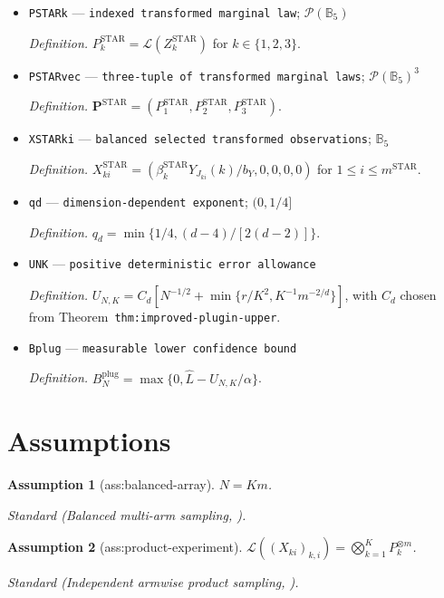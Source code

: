 \documentclass{article}
\newtheorem{assumption}{Assumption}
\begin{document}
\begin{itemize}
  \item \texttt{PSTARk} --- \texttt{indexed transformed marginal law}; \(\mathcal P(\mathbb B_5)\)
  \par\smallskip\noindent\emph{Definition.} \(P_k^{\mathrm{STAR}}=\mathcal L(Z_k^{\mathrm{STAR}})\) for \(k\in\{1,2,3\}\).
  \item \texttt{PSTARvec} --- \texttt{three-\allowbreak{}tuple of transformed marginal laws}; \(\mathcal P(\mathbb B_5)^3\)
  \par\smallskip\noindent\emph{Definition.} \(\mathbf P^{\mathrm{STAR}}=(P_1^{\mathrm{STAR}},P_2^{\mathrm{STAR}},P_3^{\mathrm{STAR}})\).
  \item \texttt{XSTARki} --- \texttt{balanced selected transformed observations}; \(\mathbb B_5\)
  \par\smallskip\noindent\emph{Definition.} \(X_{ki}^{\mathrm{STAR}}=(\beta_k^{\mathrm{STAR}}Y_{J_{ki}}(k)/b_Y,0,0,0,0)\) for \(1\le i\le m^{\mathrm{STAR}}\).
  \item \texttt{qd} --- \texttt{dimension-\allowbreak{}dependent exponent}; \((0,1/4]\)
  \par\smallskip\noindent\emph{Definition.} \(q_d=\min\{1/4,(d-4)/[2(d-2)]\}\).
  \item \texttt{UNK} --- \texttt{positive deterministic error allowance}
  \par\smallskip\noindent\emph{Definition.} \(U_{N,K}=C_d[N^{-1/2}+\min\{r/K^2,K^{-1}m^{-2/d}\}]\), with \(C_d\) chosen from Theorem~\texttt{thm:improved-plugin-upper}.
  \item \texttt{Bplug} --- \texttt{measurable lower confidence bound}
  \par\smallskip\noindent\emph{Definition.} \(B_N^{\mathrm{plug}}=\max\{0,\widehat L-U_{N,K}/\alpha\}\).
\end{itemize}

\section{Assumptions}

\begin{assumption}[ass:balanced-array]\label{ass:balanced-array}
\(N=Km\).
\par\smallskip\noindent\emph{Standard} (Balanced multi-arm sampling, \cite{gao_ge_qian_2025}).
\end{assumption}

\begin{assumption}[ass:product-experiment]\label{ass:product-experiment}
\(\mathcal L((X_{ki})_{k,i})=\bigotimes_{k=1}^K P_k^{\otimes m}\).
\par\smallskip\noindent\emph{Standard} (Independent armwise product sampling, \cite{gao_ge_qian_2025}).
\end{assumption}
\end{document}
